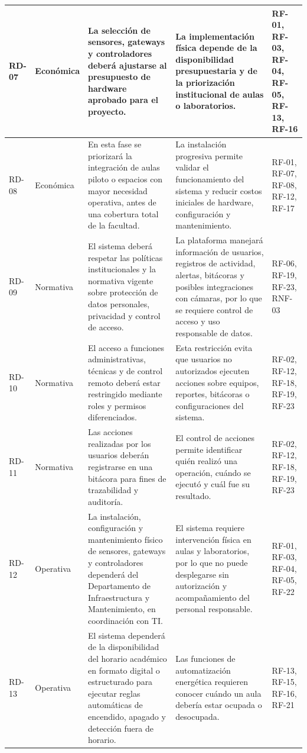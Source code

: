 \begin{longtable}{|P{0.2000}|P{0.2000}|P{0.2000}|P{0.2000}|P{0.2000}|}
RD-07 & Económica & La selección de sensores, gateways y controladores deberá ajustarse al presupuesto de hardware aprobado para el proyecto. & La implementación física depende de la disponibilidad presupuestaria y de la priorización institucional de aulas o laboratorios. & RF-01, RF-03, RF-04, RF-05, RF-13, RF-16 \\ \hline
RD-08 & Económica & En esta fase se priorizará la integración de aulas piloto o espacios con mayor necesidad operativa, antes de una cobertura total de la facultad. & La instalación progresiva permite validar el funcionamiento del sistema y reducir costos iniciales de hardware, configuración y mantenimiento. & RF-01, RF-07, RF-08, RF-12, RF-17 \\ \hline
RD-09 & Normativa & El sistema deberá respetar las políticas institucionales y la normativa vigente sobre protección de datos personales, privacidad y control de acceso. & La plataforma manejará información de usuarios, registros de actividad, alertas, bitácoras y posibles integraciones con cámaras, por lo que se requiere control de acceso y uso responsable de datos. & RF-06, RF-19, RF-23, RNF-03 \\ \hline
RD-10 & Normativa & El acceso a funciones administrativas, técnicas y de control remoto deberá estar restringido mediante roles y permisos diferenciados. & Esta restricción evita que usuarios no autorizados ejecuten acciones sobre equipos, reportes, bitácoras o configuraciones del sistema. & RF-02, RF-12, RF-18, RF-19, RF-23 \\ \hline
RD-11 & Normativa & Las acciones realizadas por los usuarios deberán registrarse en una bitácora para fines de trazabilidad y auditoría. & El control de acciones permite identificar quién realizó una operación, cuándo se ejecutó y cuál fue su resultado. & RF-02, RF-12, RF-18, RF-19, RF-23 \\ \hline
RD-12 & Operativa & La instalación, configuración y mantenimiento físico de sensores, gateways y controladores dependerá del Departamento de Infraestructura y Mantenimiento, en coordinación con TI. & El sistema requiere intervención física en aulas y laboratorios, por lo que no puede desplegarse sin autorización y acompañamiento del personal responsable. & RF-01, RF-03, RF-04, RF-05, RF-22 \\ \hline
RD-13 & Operativa & El sistema dependerá de la disponibilidad del horario académico en formato digital o estructurado para ejecutar reglas automáticas de encendido, apagado y detección fuera de horario. & Las funciones de automatización energética requieren conocer cuándo un aula debería estar ocupada o desocupada. & RF-13, RF-15, RF-16, RF-21 \\ \hline

\end{longtable}

